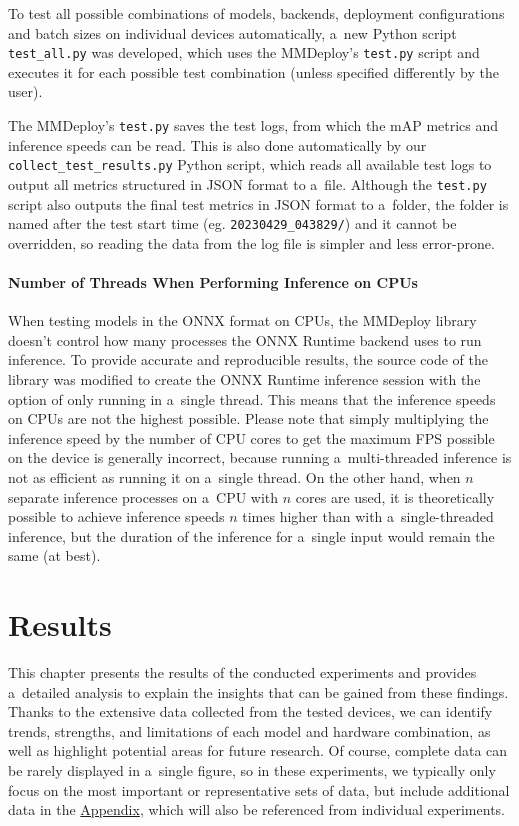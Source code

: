 To test all possible combinations of models, backends, deployment configurations
and batch sizes on individual devices automatically, a~new Python script
\texttt{test\_all.py} was developed, which uses the MMDeploy's \texttt{test.py}
script and executes it for each possible test combination (unless specified
differently by the user).

The MMDeploy's \texttt{test.py} saves the test logs, from which the mAP metrics
and inference speeds can be read. This is also done automatically by our
\texttt{collect\_test\_results.py} Python script, which reads all available test
logs to output all metrics structured in JSON format to a~file. Although the
\texttt{test.py} script also outputs the final test metrics in JSON format to
a~folder, the folder is named after the test start time (eg.
\texttt{20230429\_043829/}) and it cannot be overridden, so reading the data from
the log file is simpler and less error-prone.


\subsubsection*{Number of Threads When Performing Inference on CPUs}

When testing models in the ONNX format on CPUs, the MMDeploy library doesn't
control how many processes the ONNX Runtime backend uses to run inference. To
provide accurate and reproducible results, the source code of the library was
modified to create the ONNX Runtime inference session with the option of only
running in a~single thread. This means that the inference speeds on CPUs are not
the highest possible. Please note that simply multiplying the inference speed by
the number of CPU cores to get the maximum FPS possible on the device is
generally incorrect, because running a~multi-threaded inference is not as
efficient as running it on a~single thread. On the other hand, when $n$ separate
inference processes on a~CPU with $n$ cores are used, it is theoretically
possible to achieve inference speeds $n$ times higher than with
a~single-threaded inference, but the duration of the inference for a~single
input would remain the same (at best).




\chapter{Results}
\label{Results}

This chapter presents the results of the conducted experiments and provides
a~detailed analysis to explain the insights that can be gained from these
findings. Thanks to the extensive data collected from the tested devices, we can
identify trends, strengths, and limitations of each model and hardware
combination, as well as highlight potential areas for future research. Of
course, complete data can be rarely displayed in a~single figure, so in these
experiments, we typically only focus on the most important or representative sets
of data, but include additional data in the \hyperref[Appendix]{Appendix}, which
will also be referenced from individual experiments.

